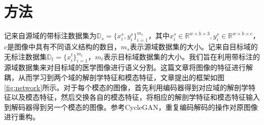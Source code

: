 \chapter{方法}
\label{cha:method}
记来自源域的带标注数据集为$\mathbb{D}_s = \{x^s_i, y_i^s\}_{i=1}^{m_s}$，其中$x_i^s\in \mathbb{R}^{w\times h \times 3},y_i^s\in \mathbb{R}^{w\times h\times c}$，$c$是图像中具有不同语义结构的数目，$m_s$表示源域数据集的大小。记来自目标域的无标注数据集$\mathbb{D}_t=\{x_i^t\}_{i=1}^{m_t}$，$m_t$表示目标域数据集的大小。我们旨在利用带标注的源域数据集来对目标域的医学图像进行语义分割。这篇文章将图像的特征进行解耦，从而学习到两个域的解剖学特征和模态特征，文章提出的框架如图\ref{fig:network}所示。对于每个模态的图像，首先利用编码器得到对应域的解剖学特征以及模态特征，然后交换各自的模态特征，将相应的解剖学特征和模态特征输入到解码器得到另一个模态的图像。参考CycleGAN，重复编码解码的操作对原图像进行重构。%

